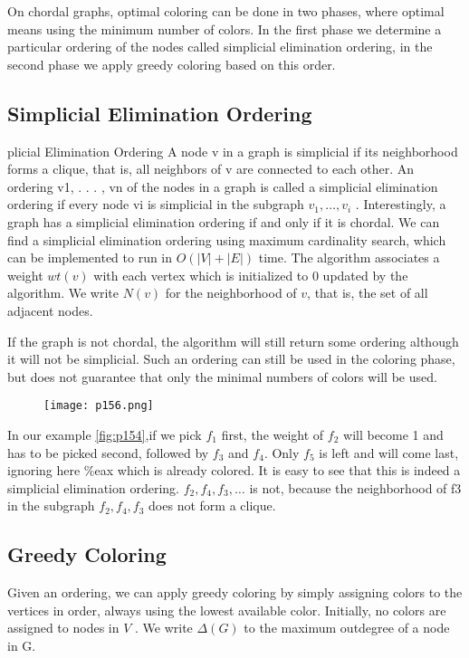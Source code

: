 On chordal graphs, optimal coloring can be done in two phases, where
optimal means using the minimum number of colors. In the first phase
we determine a particular ordering of the nodes called simplicial elimination
ordering, in the second phase we apply greedy coloring based on this order.


\subsection{Simplicial Elimination Ordering}

plicial Elimination Ordering
A node v in a graph is simplicial if its neighborhood forms a clique, that
is, all neighbors of v are connected to each other. An ordering v1, . . . , vn
of the nodes in a graph is called a simplicial elimination ordering if every
node vi
is simplicial in the subgraph $v_1, \dots , v_i$
. Interestingly, a graph has
a simplicial elimination ordering if and only if it is chordal. We can find
a simplicial elimination ordering using maximum cardinality search, which
can be implemented to run in $O(|V | + |E|)$ time. The algorithm associates
a weight $wt(v)$ with each vertex which is initialized to 0 updated by the
algorithm. We write $N(v)$ for the neighborhood of $v$, that is, the set of all
adjacent nodes.

If the graph is not chordal, the algorithm will still return some ordering
although it will not be simplicial. Such an ordering can still be used in the
coloring phase, but does not guarantee that only the minimal numbers of colors will be used.

\begin{figure}[H]
	\centering
	\texttt{[image: p156.png]}
	\caption{}
	\label{fig:p156}
\end{figure}

In our example \ref{fig:p154},if we pick $f_1$ first, the weight of $f_2$ will become 1 and has 
to be picked second, followed by $f_3$ and $f_4$. 
Only $f_5$ is left and will come last, ignoring here
\%eax which is already colored. It is easy to see that this is indeed a simplicial 
elimination ordering. $f_2, f_4, f_3,\dots$ is not, because the neighborhood of
f3 in the subgraph $f_2, f_4, f_3$ does not form a clique.


\subsection{Greedy Coloring}

Given an ordering, we can apply greedy coloring by simply assigning colors to the 
vertices in order, always using the lowest available color. Initially,
no colors are assigned to nodes in $V$ . We write $\Delta(G)$ to the maximum 
outdegree of a node in G.


